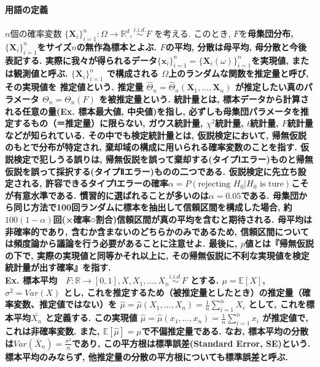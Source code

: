 \documentclass[paper=a4paper,fontsize=10pt]{jlreq}
\begin{document}
\paragraph{用語の定義}
$n$個の確率変数 $\{\mathbf{X}_i\}_{i=1}^{n} : \Omega\rightarrow\mathbb{R}^d,  \overset{i.i.d.}{\sim}F$ を考える. このとき, $F$を\rmfamily\mcfamily\bfseries{母集団分布}\mdseries, $\{\mathbf{X}_i\}_{i=1}^{n}$をサイズ$n$の\rmfamily\mcfamily\bfseries{無作為標本}\mdseries とよぶ. $F$の平均, 分散は\rmfamily\mcfamily\bfseries{母平均, 母分散}\mdseries と今後表記する. 実際に我々が得られるデータ$\{\mathbf{x}_i\}_{i=1}^{n}=\{\mathbf{X}_i(\omega)\}_{i=1}^{n}$を\rmfamily\mcfamily\bfseries{実現値}\mdseries, または\rmfamily\mcfamily\bfseries{観測値}\mdseries と呼ぶ. $\{\mathbf{X}_i\}_{i=1}^{n}$ で構成される $\Omega$上のランダムな関数を\rmfamily\mcfamily\bfseries{推定量}\mdseries と呼び, その\rmfamily\mcfamily\bfseries{実現値}\mdseries を \rmfamily\mcfamily\bfseries{推定値}\mdseries という. 推定量 $\hat{\Theta}_n=\hat{\Theta}_n (\mathbf{X}_1, \dots, \mathbf{X}_n)$ が推定したい真のパラメータ $\Theta_n=\Theta_n (F)$ を\rmfamily\mcfamily\bfseries{被推定量}\mdseries という. \rmfamily\mcfamily\bfseries{統計量}\mdseries とは, 標本データから計算される任意の量(Ex. 標本最大値, 中央値)を指し, 必ずしも母集団パラメータを推定するもの（＝推定量）に\rmfamily\mcfamily\bfseries{限らない}\mdseries , ガウス統計量, $\chi^2$統計量, $t$統計量, $F$統計量などが知られている. その中でも\rmfamily\mcfamily\bfseries{検定統計量}\mdseries とは, 仮説検定において, \rmfamily\mcfamily\bfseries{帰無仮説のもとで}\mdseries 分布が特定され, 棄却域の構成に用いられる確率変数のことを指す. 仮説検定で犯しうる誤りは, 帰無仮説を誤って棄却する(タイプⅠエラー)ものと帰無仮説を誤って採択する(タイプⅡエラー)ものの二つである. 仮説検定に先立ち設定される, \rmfamily\mcfamily\bfseries{許容できるタイプⅠエラーの確率}\mdseries $\alpha =P(\text{rejecting } H_0|H_0 \text{ is ture})$こそが\rmfamily\mcfamily\bfseries{有意水準}\mdseries である. 慣習的に選ばれることが多いのは$\alpha=0.05$である. 母集団から同じ方法で100回ランダムに標本を抽出して信頼区間を構成した場合, 約$100(1-\alpha)$回(×確率○割合)信頼区間が真の平均を含むと期待される. 母平均は非確率的であり, 含むか含まないのどちらかのみであるため, 信頼区間については頻度論から議論を行う必要があることに注意せよ. 最後に, $p$値とは\rmfamily\mcfamily\bfseries{『帰無仮説の下で, 実際の実現値と同等かそれ以上に, その帰無仮説に不利な実現値を検定統計量が出す確率』}\mdseries を指す. \\

\rmfamily\mcfamily\bfseries{Ex. 標本平均}\mdseries　$F:\mathbb{R}\rightarrow[0, 1], X, X_1, \dots, X_n \overset{i.i.d.}{\sim}F$ とする. $\mu=\mathbb{E} [X]$, $\sigma^2 = Var(X)$ とし, これを推定するため（被推定量としたとき）の\rmfamily\mcfamily\bfseries{推定量}\mdseries（確率変数、推定値ではない）を $\hat{\mu}=\hat{\mu}(X_1, \dots, X_n)=\frac{1}{n}\sum_{i = 1}^{n}X_i$ として, これを標本平均$\bar{X_n}$ と定義する. この実現値 $\hat{\mu}=\hat{\mu}(x_1, \dots, x_n)=\frac{1}{n}\sum_{i = 1}^{n}x_i$ が推定値で, これは非確率変数. また, $\mathbb{E}[\hat{\mu}]=\mu$で不偏推定量である. なお, 標本平均の分散は$Var(\bar{X}_n)=\frac{\sigma^2}{n}$であり, この平方根は標準誤差(Standard Error, SE)という. 標本平均のみならず, 他推定量の分散の平方根についても標準誤差と呼ぶ.\\
\end{document}

